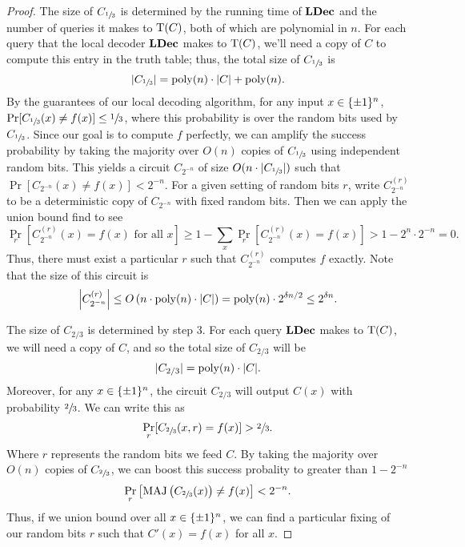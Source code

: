 \documentclass[11pt]{article}
\begin{document}
\begin{proof}
    The size of $C_{\sfrac{1}{3}}$ is determined by the running time of $\text{\textbf{LDec}}$ and the number of queries it makes to $\mathrm{T}(C)$, both of which are polynomial in $n$. For each query that the local decoder $\text{\textbf{LDec}}$ makes to $\mathrm{T}(C)$, we'll need a copy of $C$ to compute this entry in the truth table; thus, the total size of $C_{\sfrac{1}{3}}$ is 
    \begin{equation*}
        |C_{\sfrac{1}{3}}| = \mathrm{poly}(n) \cdot |C| + \mathrm{poly}(n).
    \end{equation*}
    By the guarantees of our local decoding algorithm, for any input $x \in \{\pm 1\}^n$, $\Pr[C_{\sfrac{1}{3}}(x) \neq f(x)] \leq \sfrac{1}{3}$, where this probability is over the random bits used by $C_{\sfrac{1}{3}}$. Since our goal is to compute $f$ perfectly, we can amplify the success probability by taking the majority over $O(n)$ copies of $C_{\sfrac{1}{3}}$ using independent random bits. This yields a circuit $C_{2^{-n}}$ of size $O(n \cdot |C_{\sfrac{1}{3}}|)$ such that $\Pr[C_{2^{-n}}(x) \neq f(x)] < 2^{-n}$. For a given setting of random bits $r$, write $C_{2^{-n}}^{(r)}$ to be a deterministic copy of $C_{2^{-n}}$ with fixed random bits. Then we can apply the union bound find to see
    \begin{equation*}
        \Pr_r\left[C^{(r)}_{2^{-n}}(x) = f(x) \text{ for all $x$}\right] \geq 1 - \sum_{x} \Pr_r\left[C^{(r)}_{2^{-n}}(x) = f(x)\right] > 1 - 2^{n} \cdot 2^{-n} = 0.
    \end{equation*}
    Thus, there must exist a particular $r$ such that $C^{(r)}_{2^{-n}}$ computes $f$ exactly. Note that the size of this circuit is 
    \begin{equation*}
        \left|C^{(r)}_{2^{-n}}\right| \leq O\left(n \cdot \mathrm{poly}(n) \cdot |C|\right) = \mathrm{poly}(n) \cdot 2^{\delta n / 2} \leq 2^{\delta n}.
    \end{equation*}

    The size of $C_{2/3}$ is determined by step $3$. For each query $\text{\textbf{LDec}}$ makes to $\mathrm{T}(C)$, we will need a copy of $C$, and so the total size of $C_{2/3}$ will be 
    \begin{equation*}
        |C_{2/3}| = \mathrm{poly}(n) \cdot |C|.
    \end{equation*}
    Moreover, for any $x \in \{\pm 1\}^n$, the circuit $C_{2/3}$ will output $C(x)$ with probability $\sfrac{2}{3}$. We can write this as 
    \begin{equation*}
        \Pr_{r}[C_{\sfrac{2}{3}}(x, r) = f(x)] > \sfrac{2}{3}.
    \end{equation*}
    Where $r$ represents the random bits we feed $C$. By taking the majority over $O(n)$ copies of $C_{\sfrac{2}{3}}$, we can boost this success probality to greater than $1 - 2^{-n}$
    \begin{equation*}
        \Pr_{r} \left[\mathrm{MAJ} \left(C_{\sfrac{2}{3}}(x)\right) \neq f(x)\right] < 2^{-n}.
    \end{equation*}
    Thus, if we union bound over all $x \in \{\pm 1\}^n$, we can find a particular fixing of our random bits $r$ such that $C'(x) = f(x)$ for all $x$.
\end{proof}
\end{document}
